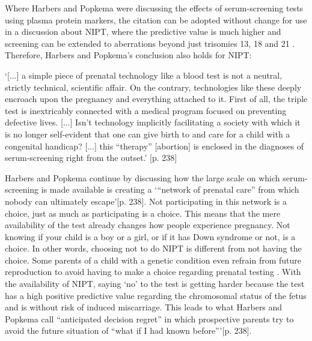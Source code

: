 \noindent Where Harbers and Popkema were discussing the effects of serum-screening tests using plasma protein markers, the citation can be adopted without change for use in a discussion about NIPT, where the predictive value is much higher and screening can be extended to aberrations beyond just trisomies 13, 18 and 21 \cite{Bianchi_2014,Amorim_Costa_2017}. 
Therefore, Harbers and Popkema’s conclusion also holds for NIPT: \newline 

\hfill\begin{minipage}{\dimexpr\textwidth-1cm}
	‘[...] a simple piece of prenatal technology like a blood test is not a neutral, strictly technical, scientific affair. On the contrary, technologies like these deeply encroach upon the pregnancy and everything attached to it. First of all, the triple test is inextricably connected with a medical program focused on preventing defective lives. [...] Isn’t technology implicitly facilitating a society with which it is no longer self-evident that one can give birth to and care for a child with a congenital handicap? [...] this “therapy” [abortion] is enclosed in the diagnoses of serum-screening right from the outset.’ \cite{Harbers_2005}[p. 238]
\end{minipage} \newline \newline

\noindent Harbers and Popkema continue by discussing how the large scale on which serum-screening is made available is creating a ‘“network of prenatal care” from which nobody can ultimately escape’[p. 238]. 
Not participating in this network is a choice, just as much as participating is a choice. 
This means that the mere availability of the test already changes how people experience pregnancy. 
Not knowing if your child is a boy or a girl, or if it has Down syndrome or not, is a choice. 
In other words, choosing not to do NIPT is different from not having the choice. Some parents of a child with a genetic condition even refrain from future reproduction to avoid having to make a choice regarding prenatal testing \cite{Kelly_2009}. 
With the availability of NIPT, saying ‘no’ to the test is getting harder because the test has a high positive predictive value regarding the chromosomal status of the fetus and is without risk of induced miscarriage. 
This leads to what Harbers and Popkema call “anticipated decision regret” in which prospective parents try to avoid the future situation of “what if I had known before”’\cite{Harbers_2005}[p. 238]. 

